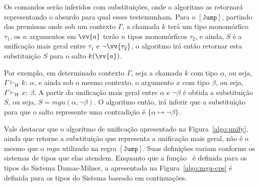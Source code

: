 Os comandos serão inferidos com substituições, onde o algoritmo as retornará representando o absurdo para qual esses testemunham.
Para o $\mathtt{[Jump]}$, partindo das premissas onde sob um contexto $\Gamma$, a chamada $k$ terá um tipo monomórfico $\tau_1$, os $n$ argumentos em $\vv{a}$ terão $n$ tipos monomórficos $\tau_2$, e ainda, $S$ é a unificação mais geral entre $\tau_1$ e $\neg\vv{\tau_2}$, o algoritmo irá então retornar esta substituição $S$ para o salto $k(\vv{a})$.

\begin{prooftree}
\end{prooftree}
Por exemplo, em determinado contexto $\Gamma$, seja a chamada $k$ com tipo $\alpha$, ou seja, $\Gamma \vdash_W k{:}\ \alpha$, e ainda sob o mesmo contexto, o argumento $x$ com tipo $\beta$, ou seja, $\Gamma \vdash_W x{:}\ \beta$.
A partir da unificação mais geral entre $\alpha$ e $\neg\beta$ é obtida a substituição $S$, ou seja, $S = \mathit{mgu}(\alpha, \neg\beta)$.
O algoritmo então, irá inferir que a substituição para que o salto represente uma contradição é $\{\alpha \mapsto \neg\beta\}$.

Vale destacar que o algoritmo de unificação apresentado na Figura~\ref{algo:unify}, ainda que retorne a substituição que representa a unificação mais geral, não é o mesmo que o $\mathit{mgu}$ utilizado na regra $[\mathtt{Jump}]$.
Suas definições variam conforme os sistemas de tipos que elas atendem.
Enquanto que a função \Unify\ é definida para os tipos do Sistema Damas-Milner, a \Mgu apresentada na Figura~\ref{algo:mgu-cps} é definida para os tipos do Sistema baseado em continuações.

